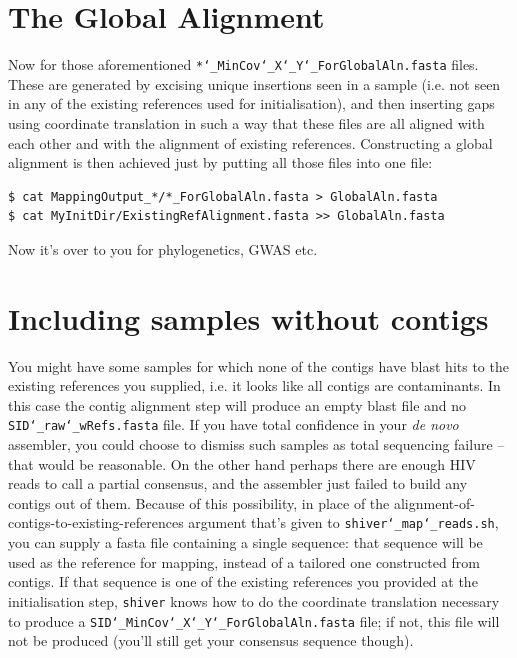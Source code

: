 \documentclass{article}
\newcommand{\shiv}{\texttt{shiver}\xspace}
\let\c\texttt
\begin{document}
\section{The Global Alignment} \label{sec:GlobalAln}

Now for those aforementioned \c{*\char`_MinCov\char`_X\char`_Y\char`_ForGlobalAln.fasta} files.
These are generated by excising unique insertions seen in a sample (i.e. not seen in any of the existing references used for initialisation), and then inserting gaps using coordinate translation in such a way that these files are all aligned with each other and with the alignment of existing references.
Constructing a global alignment is then achieved just by putting all those files into one file:
\begin{Verbatim}[samepage=true]
$ cat MappingOutput_*/*_ForGlobalAln.fasta > GlobalAln.fasta
$ cat MyInitDir/ExistingRefAlignment.fasta >> GlobalAln.fasta
\end{Verbatim}
Now it's over to you for phylogenetics, GWAS etc.

\section{Including samples without contigs}
You might have some samples for which none of the contigs have blast hits to the existing references you supplied, i.e. it looks like all contigs are contaminants.
In this case the contig alignment step will produce an empty blast file and no \c{SID\char`_raw\char`_wRefs.fasta} file.
If you have total confidence in your {\it de novo} assembler, you could choose to dismiss such samples as total sequencing failure -- that would be reasonable.
On the other hand perhaps there are enough HIV reads to call a partial consensus, and the assembler just failed to build any contigs out of them.
Because of this possibility, in place of the alignment-of-contigs-to-existing-references argument that's given to \c{shiver\char`_map\char`_reads.sh}, you can supply a fasta file containing a single sequence: that sequence will be used as the reference for mapping, instead of a tailored one constructed from contigs.
If that sequence is one of the existing references you provided at the initialisation step, \shiv knows how to do the coordinate translation necessary to produce a \c{SID\char`_MinCov\char`_X\char`_Y\char`_ForGlobalAln.fasta} file; if not, this file will not be produced (you'll still get your consensus sequence though).
\end{document}
